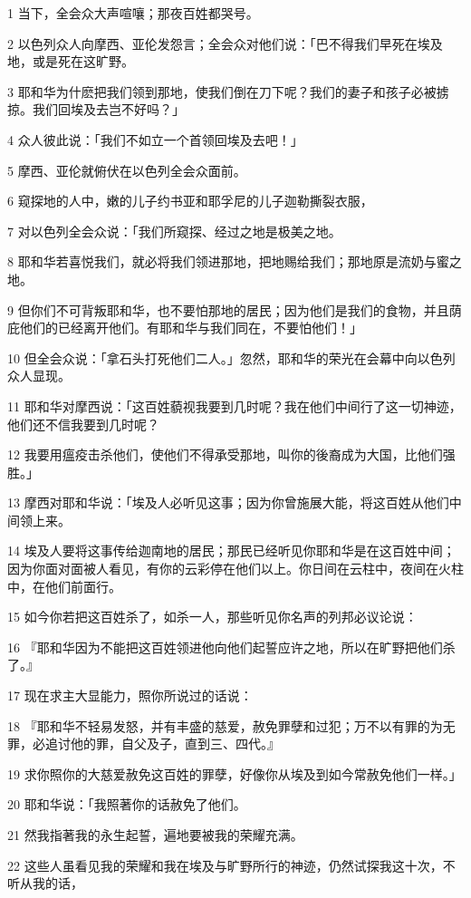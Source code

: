 \par 1 当下，全会众大声喧嚷；那夜百姓都哭号。
\par 2 以色列众人向摩西、亚伦发怨言；全会众对他们说：「巴不得我们早死在埃及地，或是死在这旷野。
\par 3 耶和华为什麽把我们领到那地，使我们倒在刀下呢？我们的妻子和孩子必被掳掠。我们回埃及去岂不好吗？」
\par 4 众人彼此说：「我们不如立一个首领回埃及去吧！」
\par 5 摩西、亚伦就俯伏在以色列全会众面前。
\par 6 窥探地的人中，嫩的儿子约书亚和耶孚尼的儿子迦勒撕裂衣服，
\par 7 对以色列全会众说：「我们所窥探、经过之地是极美之地。
\par 8 耶和华若喜悦我们，就必将我们领进那地，把地赐给我们；那地原是流奶与蜜之地。
\par 9 但你们不可背叛耶和华，也不要怕那地的居民；因为他们是我们的食物，并且荫庇他们的已经离开他们。有耶和华与我们同在，不要怕他们！」
\par 10 但全会众说：「拿石头打死他们二人。」忽然，耶和华的荣光在会幕中向以色列众人显现。
\par 11 耶和华对摩西说：「这百姓藐视我要到几时呢？我在他们中间行了这一切神迹，他们还不信我要到几时呢？
\par 12 我要用瘟疫击杀他们，使他们不得承受那地，叫你的後裔成为大国，比他们强胜。」
\par 13 摩西对耶和华说：「埃及人必听见这事；因为你曾施展大能，将这百姓从他们中间领上来。
\par 14 埃及人要将这事传给迦南地的居民；那民已经听见你耶和华是在这百姓中间；因为你面对面被人看见，有你的云彩停在他们以上。你日间在云柱中，夜间在火柱中，在他们前面行。
\par 15 如今你若把这百姓杀了，如杀一人，那些听见你名声的列邦必议论说：
\par 16 『耶和华因为不能把这百姓领进他向他们起誓应许之地，所以在旷野把他们杀了。』
\par 17 现在求主大显能力，照你所说过的话说：
\par 18 『耶和华不轻易发怒，并有丰盛的慈爱，赦免罪孽和过犯；万不以有罪的为无罪，必追讨他的罪，自父及子，直到三、四代。』
\par 19 求你照你的大慈爱赦免这百姓的罪孽，好像你从埃及到如今常赦免他们一样。」
\par 20 耶和华说：「我照著你的话赦免了他们。
\par 21 然我指著我的永生起誓，遍地要被我的荣耀充满。
\par 22 这些人虽看见我的荣耀和我在埃及与旷野所行的神迹，仍然试探我这十次，不听从我的话，
